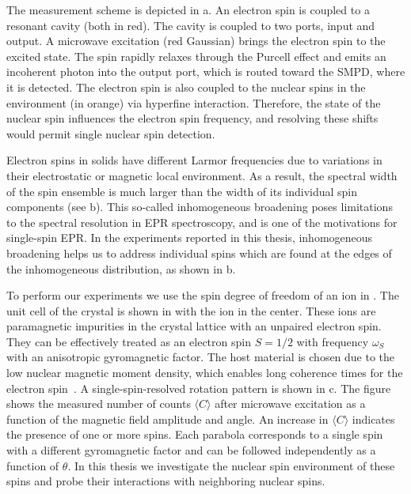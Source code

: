 The measurement scheme is depicted in a. An electron spin is coupled to a resonant cavity (both in red). The cavity is coupled to two ports, input and output. A microwave excitation (red Gaussian) brings the electron spin to the excited state. The spin rapidly relaxes through the Purcell effect and emits an incoherent photon into the output port, which is routed toward the SMPD, where it is detected. The electron spin is also coupled to the nuclear spins in the environment (in orange) via hyperfine interaction. Therefore, the state of the nuclear spin influences the electron spin frequency, and resolving these shifts would permit single nuclear spin detection.

Electron spins in solids have different Larmor frequencies due to variations in their electrostatic or magnetic local environment. As a result, the spectral width of the spin ensemble is much larger than the width of its individual spin components (see b). This so-called inhomogeneous broadening poses limitations to the spectral resolution in EPR spectroscopy, and is one of the motivations for single-spin EPR. In the experiments reported in this thesis, inhomogeneous broadening helps us to address individual spins which are found at the edges of the inhomogeneous distribution, as shown in b.

To perform our experiments we use the spin degree of freedom of an \Er ion in \Ca. The unit cell of the crystal is shown in  with the \Er ion in the center. These ions are paramagnetic impurities in the crystal lattice with an unpaired electron spin. They can be effectively treated as an electron spin $S=1/2$ with frequency $\omega_S$ with an anisotropic gyromagnetic factor. The host material is chosen due to the low nuclear magnetic moment density, which enables long coherence times for the electron spin~. A single-spin-resolved rotation pattern is shown in c. The figure shows the measured number of counts $\langle C \rangle$ after microwave excitation as a function of the magnetic field amplitude and angle. An increase in $\langle C \rangle$ indicates the presence of one or more \Er spins. Each parabola corresponds to a single \Er spin with a different gyromagnetic factor and can be followed independently as a function of $\theta$. In this thesis we investigate the nuclear spin environment of these spins and probe their interactions with neighboring nuclear spins.

